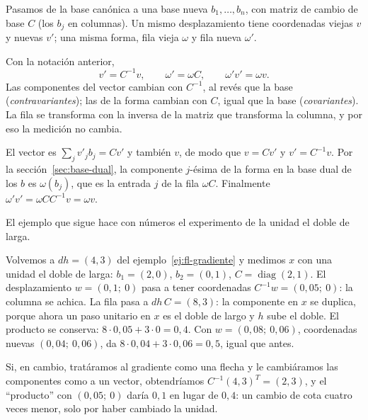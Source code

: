 Pasamos de la base canónica a una base nueva \(b_1,\ldots,b_n\), con matriz de cambio de base
\(C\) (los \(b_j\) en columnas). Un mismo desplazamiento tiene coordenadas viejas \(v\) y
nuevas \(v'\); una misma forma, fila vieja \(\omega\) y fila nueva \(\omega'\).

\begin{proposicion}\label{prop:co-contra}
Con la notación anterior,
\[
  v'=C^{-1}v,\qquad \omega'=\omega C,\qquad \omega'v'=\omega v .
\]
Las componentes del vector cambian con \(C^{-1}\), al revés que la base
(\emph{contravariantes}); las de la forma cambian con \(C\), igual que la base
(\emph{covariantes}). La fila se transforma con la inversa de la matriz que transforma la
columna, y por eso la medición no cambia.
\end{proposicion}

\begin{demostracion}
El vector es \(\sum_jv'_jb_j=Cv'\) y también \(v\), de modo que \(v=Cv'\) y \(v'=C^{-1}v\).
Por la sección~\ref{sec:base-dual}, la componente \(j\)-ésima de la forma en la base dual de
los \(b\) es \(\omega(b_j)\), que es la entrada \(j\) de la fila \(\omega C\). Finalmente
\(\omega'v'=\omega CC^{-1}v=\omega v\).
\end{demostracion}

El ejemplo que sigue hace con números el experimento de la unidad el doble de larga.

\begin{ejemplo}\label{ej:fl-cambio-unidad}
Volvemos a \(dh=(4,3)\) del ejemplo~\ref{ej:fl-gradiente} y medimos \(x\) con una unidad el
doble de larga: \(b_1=(2,0)\), \(b_2=(0,1)\), \(C=\operatorname{diag}(2,1)\). El
desplazamiento \(w=(0{,}1;\ 0)\) pasa a tener coordenadas \(C^{-1}w=(0{,}05;\ 0)\): la
columna se achica. La fila pasa a \(dh\,C=(8,3)\): la componente en \(x\) se duplica, porque
ahora un paso unitario en \(x\) es el doble de largo y \(h\) sube el doble. El producto se
conserva: \(8\cdot0{,}05+3\cdot0=0{,}4\). Con \(w=(0{,}08;\ 0{,}06)\), coordenadas nuevas
\((0{,}04;\ 0{,}06)\), da \(8\cdot0{,}04+3\cdot0{,}06=0{,}5\), igual que antes.

Si, en cambio, tratáramos al gradiente como una flecha y le cambiáramos las componentes como
a un vector, obtendríamos \(C^{-1}(4,3)^T=(2,3)\), y el \enquote{producto} con
\((0{,}05;\ 0)\) daría \(0{,}1\) en lugar de \(0{,}4\): un cambio de cota cuatro veces menor,
solo por haber cambiado la unidad.
\end{ejemplo}


